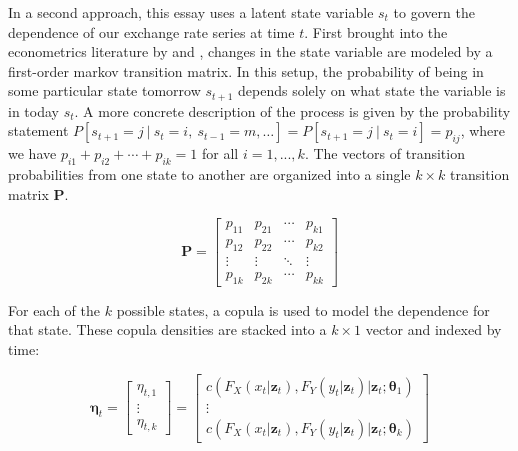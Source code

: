 In a second approach, this essay uses a latent state variable $s_{t}$ to govern the dependence of our exchange rate series at time $t$. First brought into the econometrics literature by \cite{Hamilton_1989} and \cite{Hamilton_1994}, changes in the state variable are modeled by a first-order markov transition matrix. In this setup, the probability of being in some particular state tomorrow $s_{t+1}$ depends solely on what state the variable is in today $s_{t}$. A more concrete description of the process is given by the probability statement $P\left[s_{t + 1} = j~|~s_{t}=i,~s_{t-1} = m,\ldots \right] = P\left[s_{t+1}=j~|~s_{t} = i\right] = p_{ij}$, where we have $p_{i1} + p_{i2} + \cdots + p_{ik}=1$ for all $i = 1,...,k$. The vectors of transition probabilities from one state to another are organized into a single $k\times k$ transition matrix $\mathbf{P}$.

\begin{equation}
\mathbf{P}=\left[ 
\begin{array}{cccc}
p_{11} & p_{21} & \cdots & p_{k1} \\ 
p_{12} & p_{22} & \cdots & p_{k2} \\ 
\vdots & \vdots & \ddots & \vdots \\ 
p_{1k} & p_{2k} & \cdots & p_{kk}
\end{array}
\right]
\end{equation}

For each of the $k$ possible states, a copula is used to model the dependence for that state. These copula densities are stacked into a $k\times 1$ vector and indexed by time:

\begin{equation}
\boldsymbol{\eta}_{t} = \left[ 
\begin{array}{c}
\eta _{t,1} \\ 
\vdots \\ 
\eta _{t,k}
\end{array}
\right] = \left[
\begin{array}{c}
c\left(F_{X}\left(x_{t} | \boldsymbol{z}_{t}\right), F_{Y}\left(y_{t} | \boldsymbol{z}_{t}\right) | \boldsymbol{z}_{t} ;\mathbf{\theta}_{1}\right) \\ 
\vdots \\ 
c\left(F_{X}\left(x_{t} | \boldsymbol{z}_{t}\right), F_{Y}\left(y_{t} | \boldsymbol{z}_{t}\right) | \boldsymbol{z}_{t} ;\mathbf{\theta }_{k}\right)
\end{array}
\right]
\end{equation}

